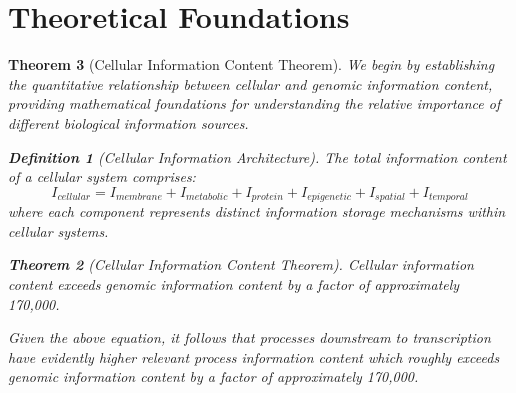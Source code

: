 \documentclass[12pt,a4paper]{article}
\newtheorem{theorem}{Theorem}[section]
\newtheorem{definition}[theorem]{Definition}
\begin{document}
\section{Theoretical Foundations}
\begin{theorem}[Cellular Information Content Theorem]
We begin by establishing the quantitative relationship between cellular and genomic information content, providing mathematical foundations for understanding the relative importance of different biological information sources.

\begin{definition}[Cellular Information Architecture]
The total information content of a cellular system comprises:
\begin{equation}
I_{cellular} = I_{membrane} + I_{metabolic} + I_{protein} + I_{epigenetic} + I_{spatial} + I_{temporal}
\end{equation}
where each component represents distinct information storage mechanisms within cellular systems.
\end{definition}

\begin{theorem}[Cellular Information Content Theorem]
Cellular information content exceeds genomic information content by a factor of approximately 170,000.
\end{theorem}
Given the above equation, it follows that processes downstream to transcription have evidently higher relevant process information content which roughly exceeds genomic information content by a factor of approximately 170,000.
\end{theorem}
\end{document}
